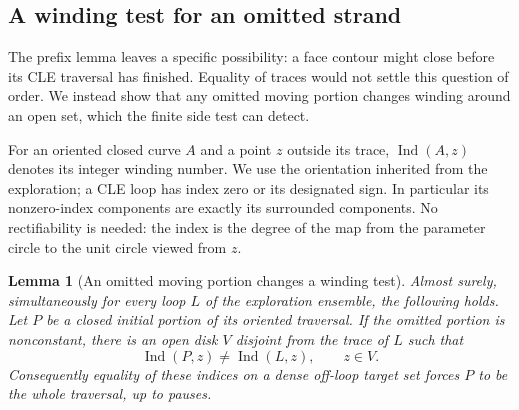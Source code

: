 \documentclass[11pt]{article}
\numberwithin{equation}{section}
\newtheorem{lemma}[theorem]{Lemma}
\theoremstyle{definition}
\theoremstyle{remark}
\newcommand{\1}{\mathbf 1}
\begin{document}
\subsection{A winding test for an omitted strand}

The prefix lemma leaves a specific possibility: a face contour might
close before its CLE traversal has finished.  Equality of traces would
not settle this question of order.  We instead show that any omitted
moving portion changes winding around an open set, which the finite
side test can detect.

For an oriented closed curve $A$ and a point $z$ outside its trace,
$\operatorname{Ind}(A,z)$ denotes its integer winding number.  We use
the orientation inherited from the exploration; a CLE loop has index
zero or its designated sign.  In particular its nonzero-index components
are exactly its surrounded components.  No rectifiability is needed:
the index is the degree of the map from the parameter circle to the
unit circle viewed from $z$.

\begin{lemma}[An omitted moving portion changes a winding test]
\label{loop:strand}
Almost surely, simultaneously for every loop $L$ of the exploration
ensemble, the following holds.  Let $P$ be a closed initial portion of
its oriented traversal.  If the omitted portion is nonconstant, there
is an open disk $V$ disjoint from the trace of $L$ such that
\[
 \operatorname{Ind}(P,z)\ne\operatorname{Ind}(L,z),\qquad z\in V.
\]
Consequently equality of these indices on a dense off-loop target set
forces $P$ to be the whole traversal, up to pauses.
\end{lemma}
\end{document}
